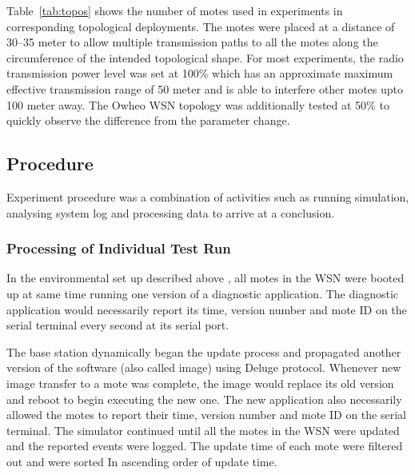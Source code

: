 \documentclass[conference,manuscript]{IEEEtran}
\newcommand{\notedme}[1]{\raisebox{0pt}[0pt][0pt]{\pdfcomment[open=true,color=blue]{#1}}}
\begin{document}
Table~\ref{tab:topos} shows the number of motes used in experiments in corresponding topological  deployments.
The motes were placed at a distance of 30--35 meter to allow  multiple transmission paths to all the motes along the circumference of the intended topological shape. %
For most experiments, the radio transmission power level was set at 100\% which has an approximate maximum effective transmission range of 50 meter and is able to interfere other motes upto 100 meter away.
The Owheo WSN topology was additionally tested at 50\%  to quickly observe the difference from the parameter change.


\subsection*{Procedure}
\label{subsec:proc}

Experiment procedure  was a combination of activities such as running simulation, analysing system log and processing data to arrive at a conclusion. 


\subsubsection*{Processing  of Individual Test Run}
\label{ssc:test_runs}
In the environmental set up described above , all motes in the WSN were booted up at same time running one version of a diagnostic application. 
The diagnostic application would necessarily report its time, version number and mote ID on the serial terminal every second at its serial port. 


The base station dynamically began the update process and propagated another version of the software (also called image) using Deluge protocol. %
Whenever new image transfer to a mote was complete, the image would replace its old version and reboot to begin executing the new one.
The new application also necessarily allowed the motes to report their time, version number and mote ID on the serial terminal. 
The simulator continued until all the motes in the WSN were updated and the reported events were logged. 
The update time of each mote were filtered out  and were sorted In ascending order of update time.
\end{document}

